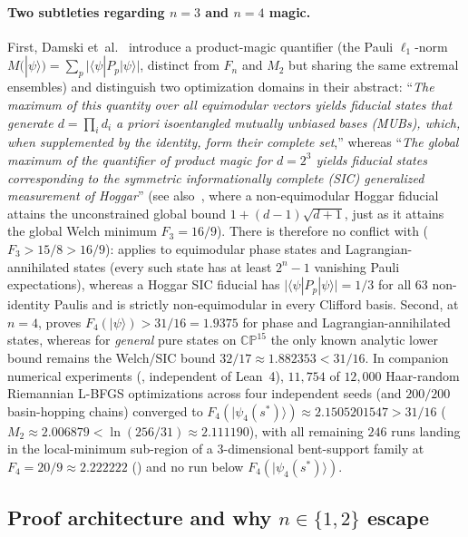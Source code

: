 \documentclass[11pt,a4paper]{article}
\theoremstyle{plain}
\theoremstyle{definition}
\theoremstyle{remark}
\newcommand{\CP}{\mathbb{CP}}
\newcommand{\ket}[1]{|#1\rangle}
\newcommand{\expval}[2]{\langle#1|#2|#1\rangle}
\newcommand{\abs}[1]{\lvert#1\rvert}
\numberwithin{equation}{section}
\begin{document}
\paragraph{Two subtleties regarding $n = 3$ and $n = 4$ magic.}
First, Damski et~al.~\cite{damski2026product} introduce a product-magic quantifier (the Pauli $\ell_1$-norm $M(\ket{\psi}) = \sum_p \abs{\expval{\psi}{P_p}}$, distinct from $F_n$ and $M_2$ but sharing the same extremal ensembles) and distinguish two optimization domains in their abstract: ``\emph{The maximum of this quantity over all equimodular vectors yields fiducial states that generate $d = \prod_i d_i$ a priori isoentangled mutually unbiased bases (MUBs), which, when supplemented by the identity, form their complete set},'' whereas ``\emph{The global maximum of the quantifier of product magic for $d = 2^3$ yields fiducial states corresponding to the symmetric informationally complete (SIC) generalized measurement of Hoggar}'' (see also~\cite[Lemma~1]{damski2026product}, where a non-equimodular Hoggar fiducial attains the unconstrained global bound $1 + (d-1)\sqrt{d+1}$, just as it attains the global Welch minimum $F_3 = 16/9$). There is therefore no conflict with  ($F_3 > 15/8 > 16/9$):  applies to equimodular phase states and Lagrangian-annihilated states (every such state has at least $2^n - 1$ vanishing Pauli expectations), whereas a Hoggar SIC fiducial has $\abs{\expval{\psi}{P_p}} = 1/3$ for all $63$ non-identity Paulis and is strictly non-equimodular in every Clifford basis. Second, at $n = 4$,  proves $F_4(\ket{\psi}) > 31/16 = 1.9375$ for phase and Lagrangian-annihilated states, whereas for \emph{general} pure states on $\CP^{15}$ the only known analytic lower bound remains the Welch/SIC bound $32/17 \approx 1.882353 < 31/16$. In companion numerical experiments (, independent of Lean~4), $11{,}754$ of $12{,}000$ Haar-random Riemannian L-BFGS optimizations across four independent seeds (and $200/200$ basin-hopping chains) converged to $F_4(\ket{\psi_4(s^*)}) \approx 2.1505201547 > 31/16$ ($M_2 \approx 2.006879 < \ln(256/31) \approx 2.111190$), with all remaining $246$ runs landing in the local-minimum sub-region of a $3$-dimensional bent-support family at $F_4 = 20/9 \approx 2.222222$ () and no run below $F_4(\ket{\psi_4(s^*)})$.

\subsection{Proof architecture and why \texorpdfstring{$n \in \{1, 2\}$}{n in \{1, 2\}} escape}
\end{document}
